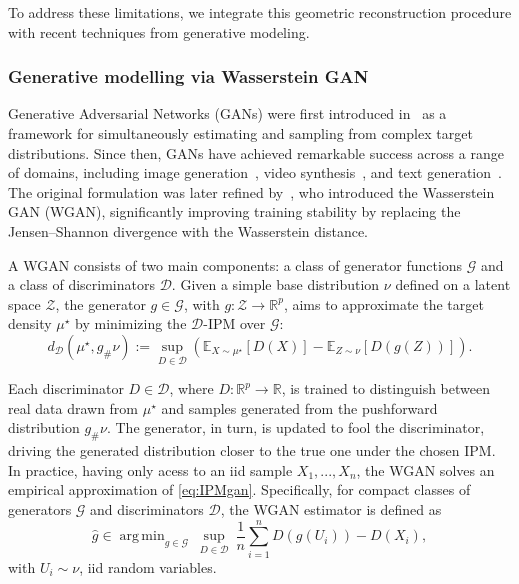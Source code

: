 \documentclass[10pt]{article}
\DeclareMathOperator*{\argmin}{arg\,min}
\begin{document}
To address these limitations, we integrate this geometric reconstruction procedure with recent techniques from generative modeling.





\subsubsection{Generative modelling via Wasserstein GAN}
Generative Adversarial Networks (GANs) were first introduced in~\citep{goodfellow2014generative} as a framework for simultaneously estimating and sampling from complex target distributions. Since then, GANs have achieved remarkable success across a range of domains, including image generation~\citep{karras2021}, video synthesis~\citep{vondrick2016generating}, and text generation~\citep{SeqGANs}. The original formulation was later refined by~\cite{arjovsky2017wasserstein}, who introduced the Wasserstein GAN (WGAN), significantly improving training stability by replacing the Jensen–Shannon divergence with the Wasserstein distance.


A WGAN consists of two main components: a class of generator functions \( \mathcal{G} \) and a class of discriminators \( \mathcal{D} \). Given a simple base distribution \( \nu \) defined on a latent space \( \mathcal{Z} \), the generator \( g \in \mathcal{G} \), with \( g: \mathcal{Z} \rightarrow \mathbb{R}^p \), aims to approximate the target density \( \mu^\star \) by minimizing the $\mathcal{D}$-IPM over \( \mathcal{G} \):
\begin{equation}\label{eq:IPMgan}
    d_{\mathcal{D}}(\mu^\star, g_{\# }\nu) := \sup_{D \in \mathcal{D}} \left( \mathbb{E}_{X \sim \mu^\star}[D(X)] - \mathbb{E}_{Z \sim \nu}[D(g(Z))] \right).
\end{equation}

Each discriminator \( D \in \mathcal{D} \), where \( D: \mathbb{R}^p \rightarrow \mathbb{R} \), is trained to distinguish between real data drawn from \( \mu^\star \) and samples generated from the pushforward distribution \( g_{\#}\nu \). The generator, in turn, is updated to fool the discriminator, driving the generated distribution closer to the true one under the chosen IPM. In practice, having only acess to an iid sample $X_1,...,X_n$, the WGAN solves an empirical approximation of \eqref{eq:IPMgan}.  Specifically, for compact classes of generators $\mathcal{G}$ and discriminators $\mathcal{D}$, the WGAN estimator is defined as
\begin{equation}\label{eq:gan}
    \hat{g}\in \argmin_{g\in \mathcal{G}}\ \sup_{D\in  \mathcal{D}}\ \frac{1}{n} \sum_{i=1}^n D(g(U_i))-D(X_i),
\end{equation}
with  $U_i\sim \nu$, iid random variables. 
\end{document}
